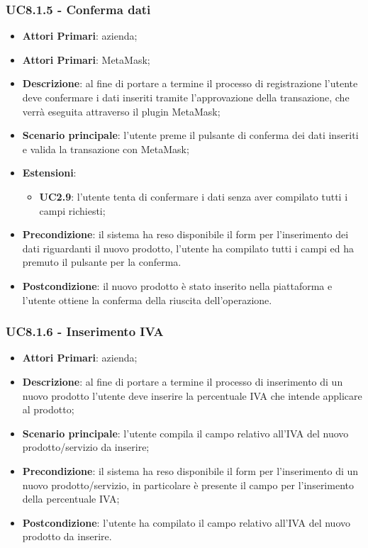 \subsubsection{UC8.1.5 - Conferma dati}
\begin{itemize}
	\item \textbf{Attori Primari}: azienda;
	\item \textbf{Attori Primari}: MetaMask\glo;
	\item \textbf{Descrizione}: al fine di portare a termine il processo di registrazione l'utente deve confermare i dati inseriti tramite l'approvazione della transazione, che verrà eseguita attraverso il plugin MetaMask\glo;
	\item \textbf{Scenario principale}: l'utente preme il pulsante di conferma dei dati inseriti e valida la transazione con MetaMask\glo;
	\item \textbf{Estensioni}:
	\begin{itemize}
		\item \textbf{UC2.9}: l'utente tenta di confermare i dati senza aver compilato tutti i campi richiesti;
	\end{itemize}
	\item \textbf{Precondizione}: il sistema ha reso disponibile il form per l'inserimento dei dati riguardanti il nuovo prodotto, l'utente ha compilato tutti i campi ed ha premuto il pulsante per la conferma.
	\item \textbf{Postcondizione}: il nuovo prodotto è stato inserito nella piattaforma e l'utente ottiene la conferma della riuscita dell'operazione.
\end{itemize}
\subsubsection{UC8.1.6 - Inserimento IVA}
\begin{itemize}
	\item \textbf{Attori Primari}: azienda;
	\item \textbf{Descrizione}: al fine di portare a termine il processo di inserimento di un nuovo prodotto l'utente deve inserire la percentuale IVA che intende applicare al prodotto;
	\item \textbf{Scenario principale}: l'utente compila il campo relativo all'IVA del nuovo prodotto/servizio da inserire;
	\item \textbf{Precondizione}: il sistema ha reso disponibile il form per l'inserimento di un nuovo prodotto/servizio, in particolare è presente il campo per l'inserimento della percentuale IVA;
	\item \textbf{Postcondizione}: l'utente ha compilato il campo relativo all'IVA del nuovo prodotto da inserire.
\end{itemize}
